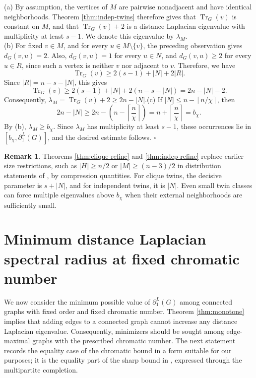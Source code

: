 \documentclass[12pt]{article}
\newcommand{\ceil}[1]{\left\lceil #1 \right\rceil}
\newcommand{\Tr}{\operatorname{Tr}}
\theoremstyle{plain}
\theoremstyle{definition}
\newtheorem{remark}[theorem]{Remark}
\renewenvironment{proof}{{\noindent\bfseries Proof. }}{\hfill$\square$\par}
\begin{document}
\begin{proof}
(a) By assumption, the vertices of $M$ are pairwise nonadjacent and have identical neighborhoods. Theorem
\ref{thm:indep-twins} therefore gives that $\Tr_G(v)$ is constant on $M$, and that $\Tr_G(v)+2$ is a distance Laplacian
eigenvalue with multiplicity at least $s-1$. We denote this eigenvalue by $\lambda_M$.\\ (b) For fixed $v\in M$, and for every $u\in M\setminus\{v\}$, the preceding observation gives $d_G(v,u)=2$. Also, $d_G(v,u)=1$ for every $u\in N$, and $d_G(v,u)\ge2$ for every $u\in R$, since such a vertex is neither $v$ nor adjacent to
$v$. Therefore, we have
\[
\Tr_G(v)
\ge 2(s-1)+|N|+2|R|.
\]
Since $|R|=n-s-|N|$, this gives
\[
\Tr_G(v)\ge 2(s-1)+|N|+2(n-s-|N|)=2n-|N|-2.
\]
Consequently, $\lambda_M=\Tr_G(v)+2\ge 2n-|N|.$\newline (c) If $|N|\le n-\ceil{n/\chi}$, then
\[
2n-|N|
\ge 2n-\left(n-\ceil{\frac{n}{\chi}}\right)
=n+\ceil{\frac{n}{\chi}}=b_\chi.
\]
By (b), $\lambda_M\ge b_\chi$. Since $\lambda_M$ has multiplicity at least $s-1$, these occurrences lie in
$[b_\chi,\partial_1^L(G)]$, and the desired estimate follows.
\end{proof}

\begin{remark}
Theorems \ref{thm:clique-refine} and \ref{thm:indep-refine} replace earlier size restrictions, such as
$|H|\ge n/2$ or $|M|\ge (n-3)/2$ in distribution statements of \cite{PirzadaKhan2021}, by compression quantities. For clique
twins, the decisive parameter is $s+|N|$, and  for independent twins, it is $|N|$. Even small twin classes can force multiple
eigenvalues above $b_\chi$ when their external neighborhoods are sufficiently small.
\end{remark}

\section{Minimum distance Laplacian spectral radius at fixed chromatic number}\label{sec:extremal}

We now consider the minimum possible value of $\partial_1^L(G)$ among connected graphs with fixed order and fixed chromatic
number. Theorem \ref{thm:monotone} implies that adding edges to a connected graph cannot increase any distance Laplacian
eigenvalue. Consequently, minimizers should be sought among edge-maximal graphs with the prescribed chromatic number. The next
statement records the equality case of the chromatic bound in a form suitable for our purposes; it is the equality part of the
sharp bound in \cite{AouchicheHansen2017}, expressed through the multipartite completion.
\end{document}
